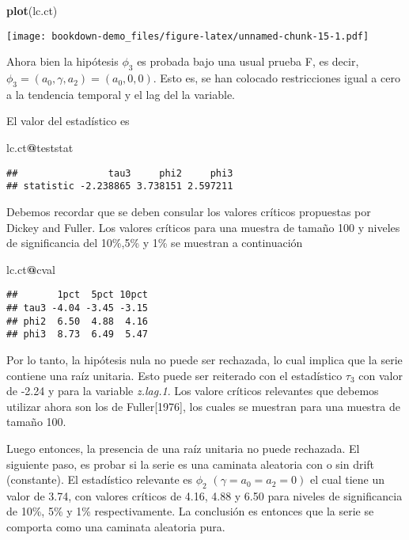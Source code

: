 \documentclass[]{book}
\newenvironment{Shaded}{\begin{snugshade}}{\end{snugshade}}
\newcommand{\KeywordTok}[1]{\textcolor[rgb]{0.13,0.29,0.53}{\textbf{#1}}}
\newcommand{\OperatorTok}[1]{\textcolor[rgb]{0.81,0.36,0.00}{\textbf{#1}}}
\newcommand{\NormalTok}[1]{#1}
\theoremstyle{definition}
\theoremstyle{definition}
\theoremstyle{definition}
\theoremstyle{remark}
\begin{document}
\begin{Shaded}
\begin{Highlighting}[]
\KeywordTok{plot}\NormalTok{(lc.ct)}
\end{Highlighting}
\end{Shaded}

\texttt{[image: bookdown-demo\_files/figure-latex/unnamed-chunk-15-1.pdf]}

Ahora bien la hipótesis \(\phi_3\) es probada bajo una usual prueba F,
es decir, \(\phi_3=(a_0,\gamma,a_2) = (a_0,0,0)\). Esto es, se han
colocado restricciones igual a cero a la tendencia temporal y el lag del
la variable.

El valor del estadístico es

\begin{Shaded}
\begin{Highlighting}[]
\NormalTok{lc.ct}\OperatorTok{@}\NormalTok{teststat}
\end{Highlighting}
\end{Shaded}

\begin{verbatim}
##                tau3     phi2     phi3
## statistic -2.238865 3.738151 2.597211
\end{verbatim}

Debemos recordar que se deben consular los valores críticos propuestas
por Dickey and Fuller. Los valores críticos para una muestra de tamaño
100 y niveles de significancia del 10\%,5\% y 1\% se muestran a
continuación

\begin{Shaded}
\begin{Highlighting}[]
\NormalTok{lc.ct}\OperatorTok{@}\NormalTok{cval}
\end{Highlighting}
\end{Shaded}

\begin{verbatim}
##       1pct  5pct 10pct
## tau3 -4.04 -3.45 -3.15
## phi2  6.50  4.88  4.16
## phi3  8.73  6.49  5.47
\end{verbatim}

Por lo tanto, la hipótesis nula no puede ser rechazada, lo cual implica
que la serie contiene una raíz unitaria. Esto puede ser reiterado con el
estadístico \(\tau_3\) con valor de -2.24 y para la variable
\emph{z.lag.1}. Los valore críticos relevantes que debemos utilizar
ahora son los de Fuller{[}1976{]}, los cuales se muestran para una
muestra de tamaño 100.

Luego entonces, la presencia de una raíz unitaria no puede rechazada. El
siguiente paso, es probar si la serie es una caminata aleatoria con o
sin drift (constante). El estadístico relevante es \(\phi_2\)
\((\gamma=a_0=a_2=0)\) el cual tiene un valor de 3.74, con valores
críticos de 4.16, 4.88 y 6.50 para niveles de significancia de 10\%, 5\%
y 1\% respectivamente. La conclusión es entonces que la serie se
comporta como una caminata aleatoria pura.
\end{document}
